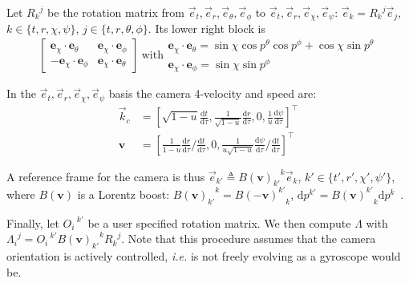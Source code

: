 \documentclass{document}
\newcommand{\diff}{\mathrm d}
\begin{document}
Let ${R_k}^j$ be the rotation matrix from $\vec{e}_t, \vec{e}_r, 
\vec{e}_\theta, \vec{e}_\phi$ to $\vec{e}_t, \vec{e}_r, \vec{e}_\chi, 
\vec{e}_\psi$: $\vec{e}_k = {R_k}^j \vec{e}_j$, $k \in \{t, r, \chi, \psi\}$, 
$j \in \{t, r, \theta, \phi\}$. Its lower right block is
\begin{equation*}
\begin{bmatrix}
\mathbf{e}_\chi \cdot \mathbf{e}_\theta & 
    \mathbf{e}_\chi \cdot \mathbf{e}_\phi \\
-\mathbf{e}_\chi \cdot \mathbf{e}_\phi &
     \mathbf{e}_\chi \cdot \mathbf{e}_\theta
\end{bmatrix}\ \mathrm{with}
\begin{array}{l}
\mathbf{e}_\chi \cdot \mathbf{e}_\theta = 
    \sin\chi \cos p^\theta \cos p^\phi + \cos\chi \sin p^\theta \\
\mathbf{e}_\chi \cdot \mathbf{e}_\phi = \sin\chi \sin p^\phi 
\end{array}
\end{equation*}

In the $\vec{e}_t, \vec{e}_r, \vec{e}_\chi, \vec{e}_\psi$ basis the camera 
4-velocity and speed are:
\begin{equation*}
\begin{split}
\vec{k}_c &= \left[ \sqrt{1 - u} \frac{\diff t}{\diff \tau}, \frac{1}{\sqrt{1 - 
u}} \frac{\diff r}{\diff \tau}, 0, \frac{1}{u} \frac{\diff \psi}{\diff \tau} 
\right]^\top \\
\mathbf{v} &= \left[\frac{1}{1 - u} \frac{\diff r}{\diff \tau} / \frac{\diff 
t}{\diff \tau}, 0, \frac{1}{u \sqrt{1 - u}} \frac{\diff \psi}{\diff \tau} / 
\frac{\diff t}{\diff \tau} \right]^\top
\end{split}
\end{equation*}

A reference frame for the camera is thus $\vec{e}_{k'} \triangleq 
{B(\mathbf{v})_{k'}}^k \vec{e}_k$, $k' \in \{t', r', \chi', \psi'\}$, where 
$B(\mathbf{v})$ is a Lorentz boost: ${B(\mathbf{v})_{k'}}^k = 
{B(-\mathbf{v})^{k'}}_k$, $\diff p^{k'} = {B(\mathbf{v})^{k'}}_k \diff 
p^k$~\cite{weinberg1972}.

Finally, let ${O_i\,}^{k'}$ be a user specified rotation matrix. We then 
compute $\Lambda$ with ${\Lambda_i}^j = {O_i\,}^{k'} {B(\mathbf{v})_{k'}}^k 
{R_k}^j$. Note that this procedure assumes that the camera orientation is 
actively controlled, {\em i.e.} is not freely evolving as a gyroscope would be.

  

\end{document}
